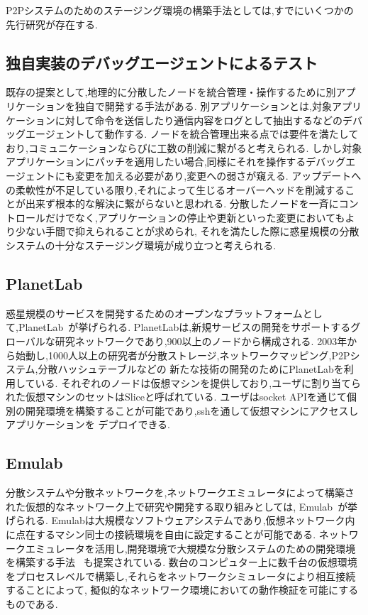 P2Pシステムのためのステージング環境の構築手法としては,すでにいくつかの先行研究が存在する.

\subsection{独自実装のデバッグエージェントによるテスト}

既存の提案として,地理的に分散したノードを統合管理・操作するために別アプリケーションを独自で開発する手法がある.
別アプリケーションとは,対象アプリケーションに対して命令を送信したり通信内容をログとして抽出するなどのデバッグエージェントして動作する.
ノードを統合管理出来る点では要件を満たしており,コミュニケーションならびに工数の削減に繋がると考えられる.
しかし対象アプリケーションにパッチを適用したい場合,同様にそれを操作するデバッグエージェントにも変更を加える必要があり,変更への弱さが窺える.
アップデートへの柔軟性が不足している限り,それによって生じるオーバーヘッドを削減することが出来ず根本的な解決に繋がらないと思われる.
分散したノードを一斉にコントロールだけでなく,アプリケーションの停止や更新といった変更においてもより少ない手間で抑えられることが求められ,
それを満たした際に惑星規模の分散システムの十分なステージング環境が成り立つと考えられる.

\subsection{PlanetLab}
\label{consideration:related-works:planetlab}

惑星規模のサービスを開発するためのオープンなプラットフォームとして,PlanetLab~\cite{PlanetLab}が挙げられる.
PlanetLabは,新規サービスの開発をサポートするグローバルな研究ネットワークであり,900以上のノードから構成される.
2003年から始動し,1000人以上の研究者が分散ストレージ,ネットワークマッピング,P2Pシステム,分散ハッシュテーブルなどの
新たな技術の開発のためにPlanetLabを利用している.
それぞれのノードは仮想マシンを提供しており,ユーザに割り当てられた仮想マシンのセットはSliceと呼ばれている.
ユーザはsocket APIを通じて個別の開発環境を構築することが可能であり,sshを通して仮想マシンにアクセスしアプリケーションを
デプロイできる.

\subsection{Emulab}
\label{consideration:related-works:emulab}

分散システムや分散ネットワークを,ネットワークエミュレータによって構築された仮想的なネットワーク上で研究や開発する取り組みとしては,
Emulab~\cite{Emulab}が挙げられる.
Emulabは大規模なソフトウェアシステムであり,仮想ネットワーク内に点在するマシン同士の接続環境を自由に設定することが可能である.
ネットワークエミュレータを活用し,開発環境で大規模な分散システムのための開発環境を構築する手法
~\cite{RelatedWork1}も提案されている.
数台のコンピュター上に数千台の仮想環境をプロセスレベルで構築し,それらをネットワークシミュレータにより相互接続することによって,
擬似的なネットワーク環境においての動作検証を可能にするものである.


